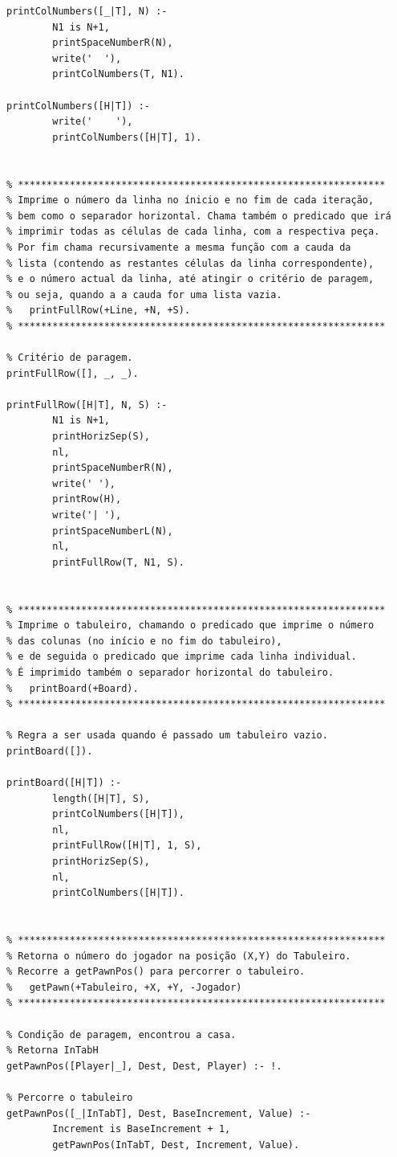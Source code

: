 \documentclass[15pt,a4paper]{article}
\begin{document}
\begin{lstlisting}
printColNumbers([_|T], N) :-
		N1 is N+1,
		printSpaceNumberR(N),
		write('  '),
		printColNumbers(T, N1).

printColNumbers([H|T]) :-
		write('    '),
		printColNumbers([H|T], 1).


% ****************************************************************
% Imprime o número da linha no ínicio e no fim de cada iteração,
% bem como o separador horizontal. Chama também o predicado que irá
% imprimir todas as células de cada linha, com a respectiva peça.
% Por fim chama recursivamente a mesma função com a cauda da
% lista (contendo as restantes células da linha correspondente),
% e o número actual da linha, até atingir o critério de paragem,
% ou seja, quando a a cauda for uma lista vazia.
%	printFullRow(+Line, +N, +S).
% ****************************************************************

% Critério de paragem.
printFullRow([], _, _).

printFullRow([H|T], N, S) :-
		N1 is N+1,
		printHorizSep(S),
		nl,
		printSpaceNumberR(N),
		write(' '),
		printRow(H),
		write('| '),
		printSpaceNumberL(N),
		nl,
		printFullRow(T, N1, S).


% ****************************************************************
% Imprime o tabuleiro, chamando o predicado que imprime o número
% das colunas (no início e no fim do tabuleiro),
% e de seguida o predicado que imprime cada linha individual.
% É imprimido também o separador horizontal do tabuleiro.
%	printBoard(+Board).
% ****************************************************************

% Regra a ser usada quando é passado um tabuleiro vazio.
printBoard([]).

printBoard([H|T]) :-
		length([H|T], S),
		printColNumbers([H|T]),
		nl,
		printFullRow([H|T], 1, S),
		printHorizSep(S),
		nl,
		printColNumbers([H|T]).


% ****************************************************************
% Retorna o número do jogador na posição (X,Y) do Tabuleiro.
% Recorre a getPawnPos() para percorrer o tabuleiro.
%	getPawn(+Tabuleiro, +X, +Y, -Jogador)
% ****************************************************************

% Condição de paragem, encontrou a casa.
% Retorna InTabH
getPawnPos([Player|_], Dest, Dest, Player) :- !.

% Percorre o tabuleiro
getPawnPos([_|InTabT], Dest, BaseIncrement, Value) :-
		Increment is BaseIncrement + 1,
		getPawnPos(InTabT, Dest, Increment, Value).


\end{lstlisting}
\end{document}
